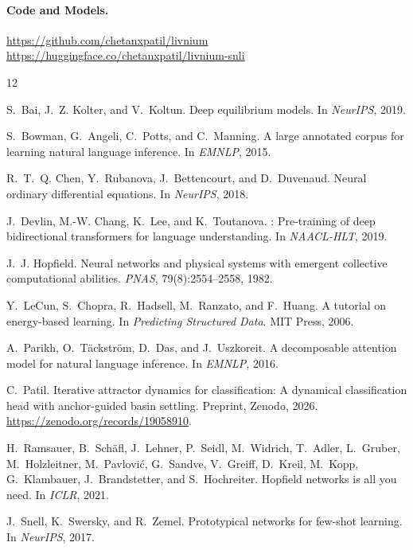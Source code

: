 \documentclass[11pt]{article}
\begin{document}
\paragraph{Code and Models.}
\url{https://github.com/chetanxpatil/livnium} \\
\url{https://huggingface.co/chetanxpatil/livnium-snli}


\begin{thebibliography}{12}

S.~Bai, J.~Z. Kolter, and V.~Koltun.
\newblock Deep equilibrium models.
\newblock In \emph{NeurIPS}, 2019.

S.~Bowman, G.~Angeli, C.~Potts, and C.~Manning.
\newblock A large annotated corpus for learning natural language inference.
\newblock In \emph{EMNLP}, 2015.

R.~T.~Q. Chen, Y.~Rubanova, J.~Bettencourt, and D.~Duvenaud.
\newblock Neural ordinary differential equations.
\newblock In \emph{NeurIPS}, 2018.

J.~Devlin, M.-W. Chang, K.~Lee, and K.~Toutanova.
: Pre-training of deep bidirectional transformers for
  language understanding.
\newblock In \emph{NAACL-HLT}, 2019.

J.~J. Hopfield.
\newblock Neural networks and physical systems with emergent collective
  computational abilities.
\newblock \emph{PNAS}, 79(8):2554--2558, 1982.

Y.~LeCun, S.~Chopra, R.~Hadsell, M.~Ranzato, and F.~Huang.
\newblock A tutorial on energy-based learning.
\newblock In \emph{Predicting Structured Data}. MIT Press, 2006.

A.~Parikh, O.~T{\"a}ckstr{\"o}m, D.~Das, and J.~Uszkoreit.
\newblock A decomposable attention model for natural language inference.
\newblock In \emph{EMNLP}, 2016.

C.~Patil.
\newblock Iterative attractor dynamics for classification: A dynamical
  classification head with anchor-guided basin settling.
\newblock Preprint, Zenodo, 2026.
\newblock \url{https://zenodo.org/records/19058910}.

H.~Ramsauer, B.~Sch{\"a}fl, J.~Lehner, P.~Seidl, M.~Widrich,
  T.~Adler, L.~Gruber, M.~Holzleitner, M.~Pavlovi{\'c}, G.~Sandve,
  V.~Greiff, D.~Kreil, M.~Kopp, G.~Klambauer, J.~Brandstetter,
  and S.~Hochreiter.
\newblock Hopfield networks is all you need.
\newblock In \emph{ICLR}, 2021.

J.~Snell, K.~Swersky, and R.~Zemel.
\newblock Prototypical networks for few-shot learning.
\newblock In \emph{NeurIPS}, 2017.

\end{thebibliography}
\end{document}
